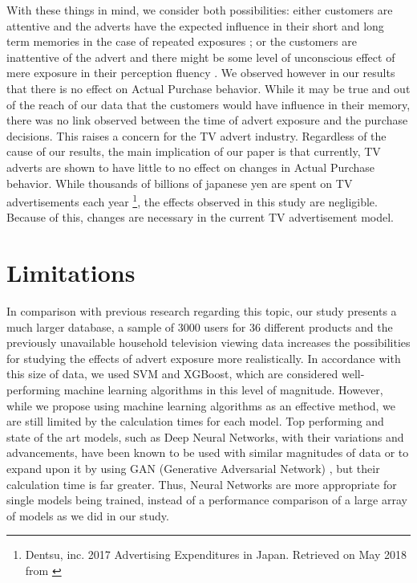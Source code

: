 \documentclass[review]{elsarticle}
\begin{document}
With these things in mind, we consider both possibilities: either customers are attentive and the adverts have the expected influence in their short and long term memories in the case of repeated exposures \cite{rossiter}; or the customers are inattentive of the advert and there might be some level of unconscious effect of mere exposure in their perception fluency \cite{fang}. We observed however in our results that there is no effect on Actual Purchase behavior. While it may be true and out of the reach of our data that the customers would have influence in their memory, there was no link observed between the time of advert exposure and the purchase decisions. This raises a concern for the TV advert industry. Regardless of the cause of our results, the main implication of our paper is that currently, TV adverts are shown to have little to no effect on changes in Actual Purchase behavior. While thousands of billions of japanese yen are spent on TV advertisements each year \footnote{\label{dentsu}Dentsu, inc. 2017 Advertising Expenditures in Japan. Retrieved on May 2018 from \href {http://www.dentsu.com/knowledgeanddata/ad_expenditures/pdf/expenditures_2017.pdf}{}}, the effects observed in this study are negligible. Because of this, changes are necessary in the current TV advertisement model.

\section{Limitations}
\label{limitations}

In comparison with previous research regarding this topic, our study presents a much larger database, a sample of 3000 users for 36 different products and the previously unavailable household television viewing data increases the possibilities for studying the effects of advert exposure more realistically. In accordance with this size of data, we used SVM and XGBoost, which are considered well-performing machine learning algorithms in this level of magnitude. However, while we propose using machine learning algorithms as an effective method, we are still limited by the calculation times for each model. Top performing and state of the art models, such as Deep Neural Networks, with their variations and advancements, have been known to be used with similar magnitudes of data or to expand upon it by using GAN (Generative Adversarial Network) \cite{goodfellow-gan}, but their calculation time is far greater. Thus, Neural Networks are more appropriate for single models being trained, instead of a performance comparison of a large array of models as we did in our study.
\end{document}

